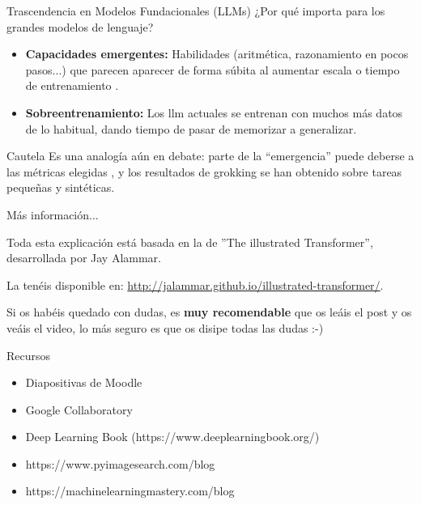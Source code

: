 \begin{frame}{Trascendencia en Modelos Fundacionales (LLMs)}
¿Por qué importa para los grandes modelos de lenguaje?
 
\begin{itemize}
    \item \textbf{Capacidades emergentes:} Habilidades (aritmética, razonamiento en pocos pasos...) que parecen aparecer \alert{de forma súbita} al aumentar escala o tiempo de entrenamiento \cite{wei2022emergent}.
    \item \textbf{Sobreentrenamiento:} Los \gls{llm} actuales se entrenan con muchos más datos de lo habitual, dando tiempo de pasar de memorizar a \alert{generalizar}.
\end{itemize}

\begin{alertblock}{Cautela}
\vspace{0.25cm}
Es una analogía \alert{aún en debate}: parte de la ``emergencia'' puede deberse a las métricas elegidas \cite{schaeffer2023mirage}, y los resultados de grokking se han obtenido sobre tareas \alert{pequeñas y sintéticas}.
\end{alertblock}
\end{frame}

\begin{frame}{Más información...}

Toda esta explicación está basada en la de ''The illustrated Transformer'', desarrollada por Jay Alammar.

La tenéis disponible en: \href{http://jalammar.github.io/illustrated-transformer/}{http://jalammar.github.io/illustrated-transformer/}.

Si os habéis quedado con dudas, es \textbf{muy recomendable} que os leáis el post y os veáis el video, lo más seguro es que os disipe todas las dudas :-)
\end{frame}


\begin{frame}{Recursos}
\begin{itemize}
    \item Diapositivas de Moodle
    \item Google Collaboratory
    \item Deep Learning Book (https://www.deeplearningbook.org/)
    \item https://www.pyimagesearch.com/blog
    \item https://machinelearningmastery.com/blog
\end{itemize}
\end{frame}


